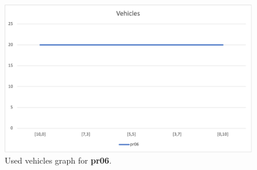 \begin{figure}[H]
    \centering
    \includegraphics[height=0.25\textheight]{../graphs/pr06-vehicles.png}
    \caption{Used vehicles graph for \textbf{pr06}.}
\end{figure}

\newpage
